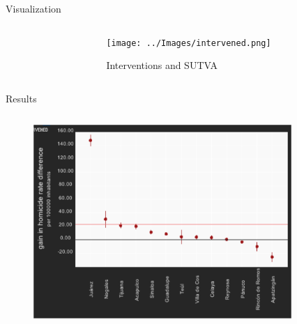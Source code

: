 \documentclass[final]{beamer}
\newlength{\onecolwid}
\newlength{\twocolwid}
\begin{document}
\begin{frame}[t]
\begin{columns}[t]
\begin{column}{\twocolwid}
\begin{block}{ Visualization }
\begin{columns}[t,totalwidth=\twocolwid]
\begin{column}{\onecolwid}
          \end{column}
   			\begin{column}{\onecolwid}
             \begin{figure}[htdp]
 	              \texttt{[image: ../Images/intervened.png]}
	              \caption*{Interventions and SUTVA}
            \end{figure}
          \end{column}
		\end{columns}
	\end{block}
	\begin{block}{Results}
		\begin{columns}[t,totalwidth=\twocolwid]
	          \begin{column}{\onecolwid}
	            \begin{figure}[htdp]
	              \includegraphics[scale=0.9]{../Images/results.png}
	            \end{figure}
	        \end{column}
\begin{column}{\onecolwid}
	            \begin{figure}[htdp]
	              {\raggedright
	              \begin{minipage}[ht]{0.58\linewidth}
\end{minipage}}
\end{figure}
\end{column}
\end{columns}
\end{block}
\end{column}
\end{columns}
\end{frame}
\end{document}
